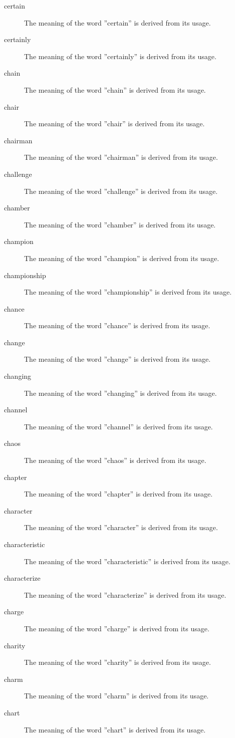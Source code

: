 \documentclass[12pt, letterpaper]{memoir}
\begin{document}
\begin{description}
\item[certain] The meaning of the word ''certain'' is derived from its usage.
\item[certainly] The meaning of the word ''certainly'' is derived from its usage.
\item[chain] The meaning of the word ''chain'' is derived from its usage.
\item[chair] The meaning of the word ''chair'' is derived from its usage.
\item[chairman] The meaning of the word ''chairman'' is derived from its usage.
\item[challenge] The meaning of the word ''challenge'' is derived from its usage.
\item[chamber] The meaning of the word ''chamber'' is derived from its usage.
\item[champion] The meaning of the word ''champion'' is derived from its usage.
\item[championship] The meaning of the word ''championship'' is derived from its usage.
\item[chance] The meaning of the word ''chance'' is derived from its usage.
\item[change] The meaning of the word ''change'' is derived from its usage.
\item[changing] The meaning of the word ''changing'' is derived from its usage.
\item[channel] The meaning of the word ''channel'' is derived from its usage.
\item[chaos] The meaning of the word ''chaos'' is derived from its usage.
\item[chapter] The meaning of the word ''chapter'' is derived from its usage.
\item[character] The meaning of the word ''character'' is derived from its usage.
\item[characteristic] The meaning of the word ''characteristic'' is derived from its usage.
\item[characterize] The meaning of the word ''characterize'' is derived from its usage.
\item[charge] The meaning of the word ''charge'' is derived from its usage.
\item[charity] The meaning of the word ''charity'' is derived from its usage.
\item[charm] The meaning of the word ''charm'' is derived from its usage.
\item[chart] The meaning of the word ''chart'' is derived from its usage.

\end{description}
\end{document}
